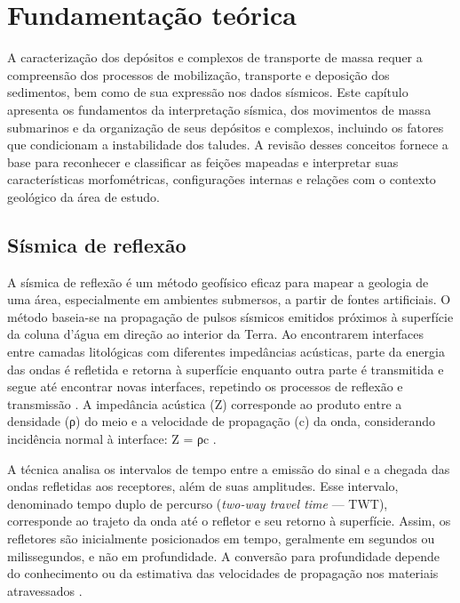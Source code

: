 \chapter{Fundamentação teórica}\label{cap:fundamentacao}

A caracterização dos depósitos e complexos de transporte de massa requer a compreensão dos processos de mobilização, transporte e deposição dos sedimentos, bem como de sua expressão nos dados sísmicos. Este capítulo apresenta os fundamentos da interpretação sísmica, dos movimentos de massa submarinos e da organização de seus depósitos e complexos, incluindo os fatores que condicionam a instabilidade dos taludes. A revisão desses conceitos fornece a base para reconhecer e classificar as feições mapeadas e interpretar suas características morfométricas, configurações internas e relações com o contexto geológico da área de estudo.

\section{Sísmica de reflexão}\label{sec:2-1}

A sísmica de reflexão é um método geofísico eficaz para mapear a geologia de uma área, especialmente em ambientes submersos, a partir de fontes artificiais. O método baseia-se na propagação de pulsos sísmicos emitidos próximos à superfície da coluna d’água em direção ao interior da Terra. Ao encontrarem interfaces entre camadas litológicas com diferentes impedâncias acústicas, parte da energia das ondas é refletida e retorna à superfície enquanto outra parte é transmitida e segue até encontrar novas interfaces, repetindo os processos de reflexão e transmissão \cite{toth2011}. A impedância acústica (Z) corresponde ao produto entre a densidade (ρ) do meio e a velocidade de propagação (c) da onda, considerando incidência normal à interface: Z = ρc \cite{yilmaz2001}.

A técnica analisa os intervalos de tempo entre a emissão do sinal e a chegada das ondas refletidas aos receptores, além de suas amplitudes. Esse intervalo, denominado tempo duplo de percurso (\textit{two-way travel time} — TWT), corresponde ao trajeto da onda até o refletor e seu retorno à superfície. Assim, os refletores são inicialmente posicionados em tempo, geralmente em segundos ou milissegundos, e não em profundidade. A conversão para profundidade depende do conhecimento ou da estimativa das velocidades de propagação nos materiais atravessados \cite{yilmaz2001}.

